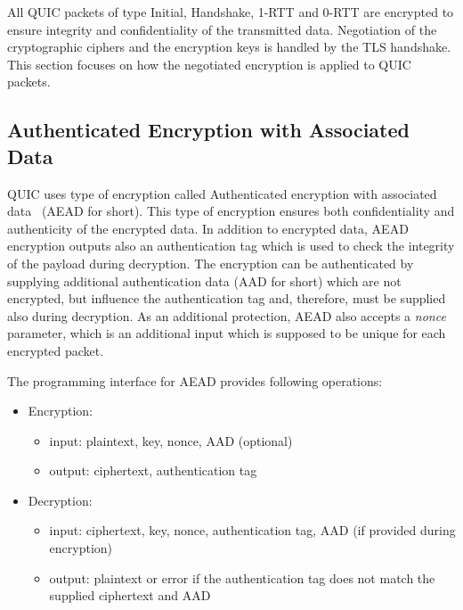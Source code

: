 All QUIC packets of type Initial, Handshake, 1-RTT and 0-RTT are encrypted to ensure integrity and
confidentiality of the transmitted data. Negotiation of the cryptographic ciphers and the encryption
keys is handled by the TLS handshake. This section focuses on how the negotiated encryption is
applied to QUIC packets.

\subsection{Authenticated Encryption with Associated Data}

QUIC uses type of encryption called Authenticated encryption with associated data~\cite{rfc5116}
(AEAD for short). This type of encryption ensures both confidentiality and authenticity of the
encrypted data. In addition to encrypted data, AEAD encryption outputs also an authentication tag
which is used to check the integrity of the payload during decryption. The encryption can be
authenticated by supplying additional authentication data (AAD for short) which are not encrypted,
but influence the authentication tag and, therefore, must be supplied also during decryption. As an
additional protection, AEAD also accepts a \textit{nonce} parameter, which is an additional input
which is supposed to be unique for each encrypted packet.

The programming interface for AEAD provides following operations:

\begin{itemize}

  \item Encryption:

  \begin{itemize}

    \item input: plaintext, key, nonce, AAD (optional)

    \item output: ciphertext, authentication tag

  \end{itemize}

  \item Decryption:

  \begin{itemize}

    \item input: ciphertext, key, nonce, authentication tag, AAD (if provided during encryption)

    \item output: plaintext or error if the authentication tag does not match the supplied
      ciphertext and AAD

  \end{itemize}

\end{itemize}

